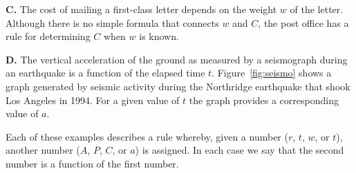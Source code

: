 \documentclass[boxednum]{chapterstart}
\begin{document}
\textbf{C.} The cost of mailing a first-class letter depends on the weight
$w$ of the letter. Although there is no simple formula that connects $w$ and
$C$, the post office has a rule for determining $C$ when $w$ is known.

\textbf{D.} The vertical acceleration of the ground as measured by a
seismograph during an earthquake is a function of the elapsed time $t$.
Figure~\ref{fig:seismo} shows a graph generated by seismic activity during
the Northridge earthquake that shook Los Angeles in 1994. For a given value
of $t$ the graph provides a corresponding value of $a$.


Each of these examples describes a rule whereby, given a number ($r$, $t$,
$w$, or $t$), another number ($A$, $P$, $C$, or $a$) is assigned. In each
case we say that the second number is a function of the first number.
\end{document}
